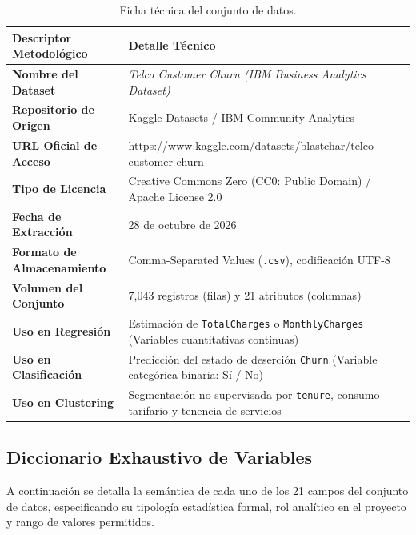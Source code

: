 \documentclass[11pt,letterpaper]{article}
\begin{document}
\begin{table}[H]
    \centering
    \small
    \caption{Ficha técnica del conjunto de datos.}
    \label{tab:ficha_tecnica}
    \begin{tabularx}{\linewidth}{p{4.2cm}X}
        \toprule
        \textbf{Descriptor Metodológico} & \textbf{Detalle Técnico} \\
        \midrule
        \textbf{Nombre del Dataset} & \textit{Telco Customer Churn (IBM Business Analytics Dataset)} \\
        \textbf{Repositorio de Origen} & Kaggle Datasets / IBM Community Analytics \\
        \textbf{URL Oficial de Acceso} & \url{https://www.kaggle.com/datasets/blastchar/telco-customer-churn} \\
        \textbf{Tipo de Licencia} & Creative Commons Zero (CC0: Public Domain) / Apache License 2.0 \\
        \textbf{Fecha de Extracción} & 28 de octubre de 2026 \\
        \textbf{Formato de Almacenamiento} & Comma-Separated Values (\texttt{.csv}), codificación UTF-8 \\
        \textbf{Volumen del Conjunto} & 7,043 registros (filas) y 21 atributos (columnas) \\
        \textbf{Uso en Regresión} & Estimación de \texttt{TotalCharges} o \texttt{MonthlyCharges} (Variables cuantitativas continuas) \\
        \textbf{Uso en Clasificación} & Predicción del estado de deserción \texttt{Churn} (Variable categórica binaria: Sí / No) \\
        \textbf{Uso en Clustering} & Segmentación no supervisada por \texttt{tenure}, consumo tarifario y tenencia de servicios \\
        \bottomrule
    \end{tabularx}
\end{table}

\subsection{Diccionario Exhaustivo de Variables}
A continuación se detalla la semántica de cada uno de los 21 campos del conjunto de datos, especificando su tipología estadística formal, rol analítico en el proyecto y rango de valores permitidos.
\end{document}
